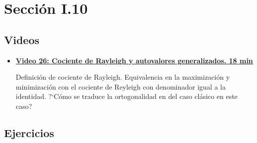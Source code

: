 \documentclass[12pt,a4paper]{article}
\newcommand\1{\mbox{\,\vrule height-0.8pt depth1.0pt width2pc\,}}
\newcommand\2{\mbox{\,\vrule height-0.8pt depth1.0pt width1pc\,}}
\begin{document}
\section{Sección I.10}


\subsection*{Videos}

\begin{itemize}


  \item       \href{https://youtu.be/HgtUtNUQ4tk}{\bf Video 26:    Cociente de Rayleigh y autovalores generalizados. 18 min} 
         
         
         Definici\'on de cociente de Rayleigh. Equivalencia en la maximizaci\'on y minimizaci\'on con el cociente de Reyleigh con denominador igual a la identidad. ?`C\'omo se traduce la ortogonalidad en del caso cl\'asico en este caso?
         
  
       
       
\end{itemize}

\subsection*{Ejercicios}
\end{document}
